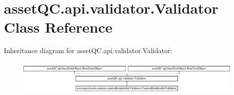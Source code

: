 \hypertarget{classassetQC_1_1api_1_1validator_1_1Validator}{\section{asset\-Q\-C.\-api.\-validator.\-Validator \-Class \-Reference}
\label{d6/d00/classassetQC_1_1api_1_1validator_1_1Validator}
}
\-Inheritance diagram for asset\-Q\-C.\-api.\-validator.\-Validator\-:\begin{figure}[H]
\begin{center}
\leavevmode
\includegraphics[height=1.742738cm]{d6/d00/classassetQC_1_1api_1_1validator_1_1Validator}
\end{center}
\end{figure}

